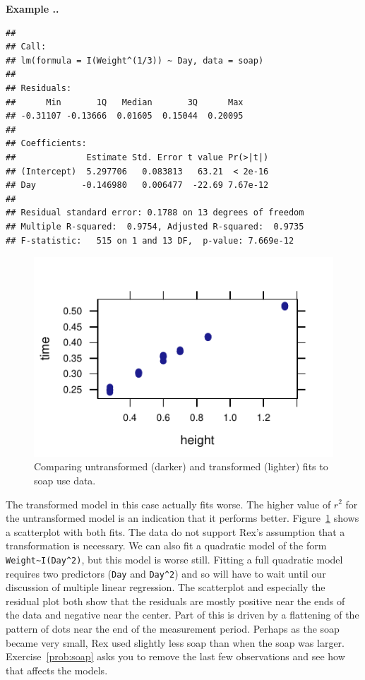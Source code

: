 \documentclass[twoside]{book}\usepackage[]{graphicx}\usepackage[]{xcolor}
\makeatletter
\def\maxwidth{ %
  \ifdim\Gin@nat@width>\linewidth
    \linewidth
  \else
    \Gin@nat@width
  \fi
}
\newenvironment{kframe}{%
 \def\at@end@of@kframe{}%
 \ifinner\ifhmode%
  \def\at@end@of@kframe{\end{minipage}}%
  \begin{minipage}{\columnwidth}%
 \fi\fi%
 \def\FrameCommand##1{\hskip\@totalleftmargin \hskip-\fboxsep
 \colorbox{shadecolor}{##1}\hskip-\fboxsep
     \hskip-\linewidth \hskip-\@totalleftmargin \hskip\columnwidth}%
 \MakeFramed {\advance\hsize-\width
   \@totalleftmargin\z@ \linewidth\hsize
   \@setminipage}}%
 {\par\unskip\endMakeFramed%
 \at@end@of@kframe}
\newenvironment{knitrout}{}{} %
\newcounter{example}[section]
\newenvironment{example}%
{\refstepcounter{example}%
\textbf{Example \thesection.\arabic{example}. }}%
{}
\makeatother
\begin{document}
\begin{example}
\begin{knitrout}
\begin{kframe}
\begin{verbatim}
## 
## Call:
## lm(formula = I(Weight^(1/3)) ~ Day, data = soap)
## 
## Residuals:
##      Min       1Q   Median       3Q      Max 
## -0.31107 -0.13666  0.01605  0.15044  0.20095 
## 
## Coefficients:
##              Estimate Std. Error t value Pr(>|t|)
## (Intercept)  5.297706   0.083813   63.21  < 2e-16
## Day         -0.146980   0.006477  -22.69 7.67e-12
## 
## Residual standard error: 0.1788 on 13 degrees of freedom
## Multiple R-squared:  0.9754,	Adjusted R-squared:  0.9735 
## F-statistic:   515 on 1 and 13 DF,  p-value: 7.669e-12
\end{verbatim}
\end{kframe}
\end{knitrout}
\begin{figure}
\begin{knitrout}
\color{fgcolor}

{\centering \includegraphics[width=\maxwidth]{figures/fig-unnamed-chunk-227-1} 

}



\end{knitrout}

\caption{Comparing untransformed (darker) and transformed 
(lighter) fits to soap use data.}
\label{fig:soap}%
\end{figure}
%
The transformed model in this case actually fits worse.
The higher value of $r^2$ for the untransformed model is an indication 
that it performs better.  
Figure~\ref{fig:soap} shows a scatterplot
with both fits.  
The data do not support Rex's assumption that a transformation
is necessary.  
We can also fit a quadratic model of the form \verb!Weight~I(Day^2)!,
but this model is worse still.  Fitting a full quadratic model requires 
two predictors (\verb!Day! and \verb!Day^2!) and so will have to wait
until our discussion of multiple linear regression.  
The scatterplot and especially the residual plot both show that the 
residuals are mostly positive near the ends of the data and negative
near the center.  Part of this is driven by a flattening of the pattern
of dots near the end of the measurement period.  Perhaps as the soap
became very small, Rex used slightly less soap than when the soap was
larger.
Exercise~\ref{prob:soap} asks you to remove the last few observations
and see how that affects the models.


\end{example}
\end{document}
